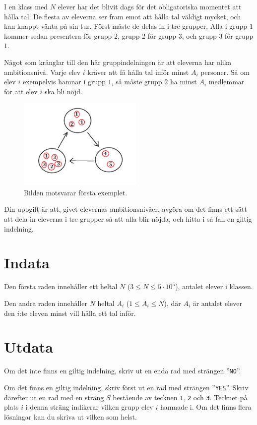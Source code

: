 I en klass med $N$ elever har det blivit dags för det obligatoriska momentet att hålla tal. 
De flesta av eleverna ser fram emot att hålla tal väldigt mycket, och kan knappt vänta på sin tur.
Först måste de delas in i tre grupper. Alla i grupp $1$ kommer sedan presentera för grupp $2$, 
grupp $2$ för grupp $3$, och grupp $3$ för grupp $1$. 

Något som krånglar till den här gruppindelningen är att eleverna har olika ambitionsnivå. Varje elev $i$
kräver att få hålla tal inför minst $A_i$ personer.
Så om elev $i$ exempelvis hamnar i grupp $1$, så måste grupp $2$ ha minst $A_i$ medlemmar för att elev $i$ ska bli nöjd.

\begin{figure}[!h]
  \centering
  \includegraphics[width=6cm]{triangeltal.png}
  \caption{Bilden motsvarar första exemplet.}
\end{figure}

Din uppgift är att, givet elevernas ambitionsnivåer, avgöra om det finns ett sätt att dela in eleverna i tre grupper så att alla blir nöjda, och hitta i så fall en giltig indelning.

\section*{Indata}
Den första raden innehåller ett heltal $N$ ($3 \leq N \leq 5 \cdot 10^5$), antalet elever i klassen.

Den andra raden innehåller $N$ heltal $A_i$ ($1 \leq A_i \leq N$), där $A_i$ är antalet elever den $i$:te eleven minst vill hålla ett tal inför.

\section*{Utdata}
Om det inte finns en giltig indelning, skriv ut en enda rad med strängen ''\texttt{NO}''.

Om det finns en giltig indelning, skriv först ut en rad med strängen ''\texttt{YES}''. 
Skriv därefter ut en rad med en sträng $S$ bestående av tecknen \texttt{1}, \texttt{2} och \texttt{3}.
Tecknet på plats $i$ i denna sträng indikerar vilken grupp elev $i$ hamnade i. Om det finns flera lösningar
kan du skriva ut vilken som helst.

